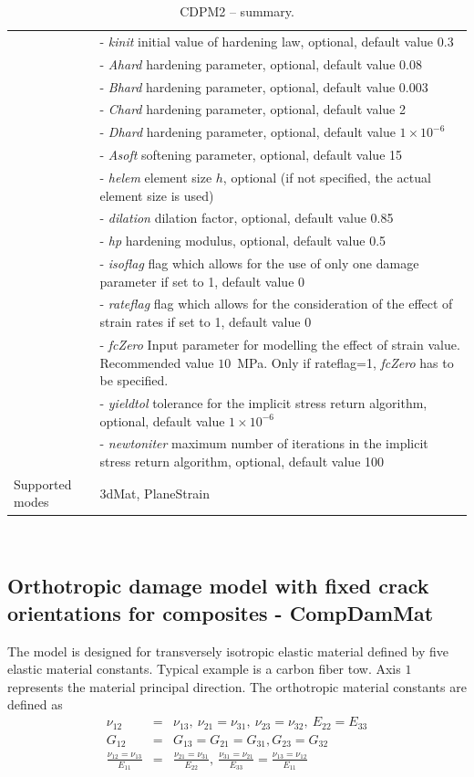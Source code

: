 \documentclass[a4paper]{article}
\newcommand{\param}[1]{{\it #1}}
\newenvironment{mmt}{\begin{tabular}{|l|p{9cm}|}}{\end{tabular}\\}
\newenvironment{mmt}{\begin{tabular}{|l|l|}}{\end{tabular}\\}
\begin{document}
\begin{table}[!htb]
\begin{mmt}
&- \param{kinit} initial value of hardening law, optional, default value 0.3\\
&- \param{Ahard} hardening parameter, optional, default value 0.08\\
&- \param{Bhard} hardening parameter, optional, default value 0.003\\
&- \param{Chard} hardening parameter, optional, default value 2\\
&- \param{Dhard} hardening parameter, optional, default value $1\times 10^{-6}$\\
&- \param{Asoft} softening parameter, optional, default value 15\\
&- \param{helem} element size $h$, optional (if not specified, the actual element size is used)\\
&- \param{dilation} dilation factor, optional, default value 0.85\\
&- \param{hp} hardening modulus, optional, default value 0.5\\
&- \param{isoflag} flag which allows for the use of only one damage parameter if set to 1, default value 0\\
&- \param{rateflag} flag which allows for the consideration of the effect of strain rates if set to 1, default value 0\\
&- \param{fcZero} Input parameter for modelling the effect of strain value. Recommended value $10$~MPa. Only if rateflag=1, \param{fcZero} has to be specified.\\
&- \param{yieldtol} tolerance for the implicit stress return algorithm, optional, default value $1 \times 10^{-6}$\\
&- \param{newtoniter} maximum number of iterations in the implicit stress return algorithm, optional, default value 100\\
Supported modes& 3dMat, PlaneStrain\\
\hline
\end{mmt}
\caption{CDPM2 -- summary.}
\label{cdpm2_table}
\end{table}

\subsection{Orthotropic damage model with fixed crack orientations for composites - CompDamMat}

The model is designed for transversely isotropic elastic material defined by five elastic material constants. Typical example is a carbon fiber tow. Axis $1$ represents the material principal direction. The orthotropic material constants are defined as
\begin{eqnarray}
\nu_{12}&=&\nu_{13},~\nu_{21}=\nu_{31},~\nu_{23}=\nu_{32},~E_{22}=E_{33}\\
G_{12}&=&G_{13}=G_{21}=G_{31},G_{23}=G_{32}\\
\frac{\nu_{12}=\nu_{13}}{E_{11}} &=& \frac{\nu_{21}=\nu_{31}}{E_{22}},~\frac{\nu_{31}=\nu_{21}}{E_{33}} = \frac{\nu_{13}=\nu_{12}}{E_{11}}
\end{eqnarray}
\end{document}
